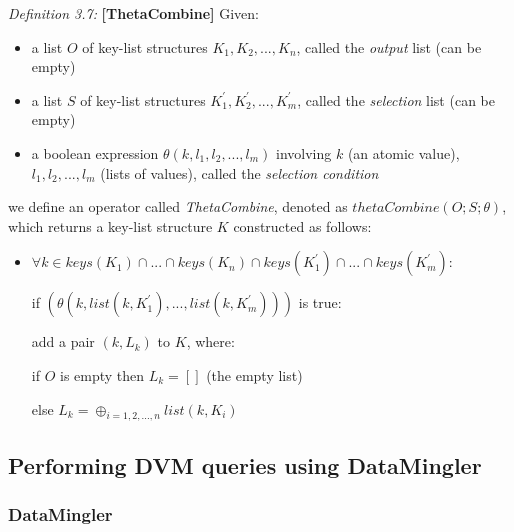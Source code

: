 \textit{Definition 3.7:} \textbf{[ThetaCombine]} Given:
    \begin{itemize}
        \item a list \(O\) of key-list structures \(K_1, K_2, ..., K_n\), called the \textit{output} list (can be empty)
        \item a list \(S\) of key-list structures \(K_1^{'}, K_2^{'}, ..., K_m^{'}\), called the \textit{selection} list (can be empty)
        \item a boolean expression \(\theta(k, l_1, l_2, ..., l_m)\) involving \(k\) (an atomic value), \(l_1, l_2, ..., l_m\) (lists of values), called the \textit{selection condition}
    \end{itemize}
we define an operator called \textit{ThetaCombine}, denoted as \(thetaCombine(O; S; \theta)\), which returns a key-list structure \(K\) constructed as follows:
\begin{itemize}
\item[] \(\forall k \in keys(K_1)\cap...\cap keys(K_n)\cap keys(K_1^{'}) \cap...\cap keys(K_m^{'})\):

   \quad if \((\theta (k, list(k, K_1^{'}), ..., list(k, K_m^{'})))\) is true:
        
        \quad \quad add a pair \((k, L_k)\) to \(K\), where:
            
            \quad \quad \quad if \(O\) is empty then \(L_k = []\) (the empty list)
            
            \quad \quad \quad else \(L_k = \oplus_{i = 1, 2, ..., n}list(k, K_i)\)\cite{chatziantoniou}
\end{itemize}

\subsection{Performing DVM queries using DataMingler}

\subsubsection{DataMingler}

